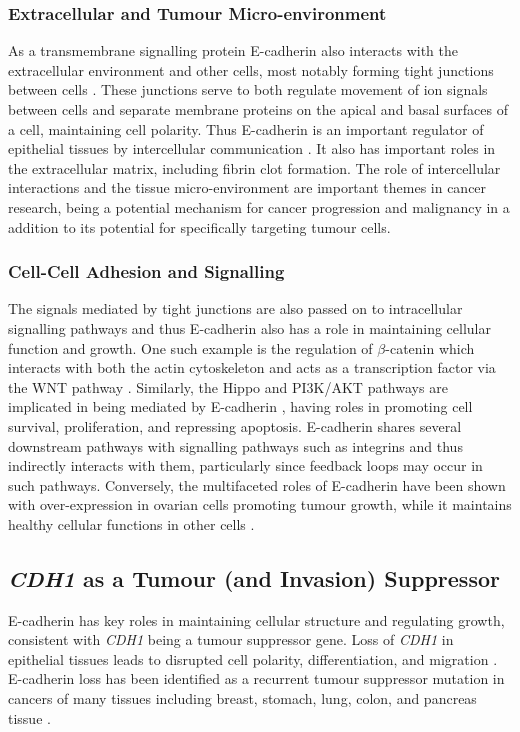 \subsubsection{Extracellular and Tumour Micro-environment}
As a transmembrane signalling protein \gls{E-cadherin} also interacts with the extracellular environment and other cells, most notably forming tight junctions between cells \citep{Chen2014, Tunggal2005}. These junctions serve to both regulate movement of ion signals between cells and separate membrane proteins on the apical and basal surfaces of a cell, maintaining cell polarity. Thus \gls{E-cadherin} is an important regulator of epithelial tissues by intercellular communication \citep{Jeanes2008}. It also has important roles in the extracellular matrix, including fibrin clot formation. The role of intercellular interactions and the tissue micro-environment are important themes in cancer research, being a potential mechanism for cancer progression and malignancy in a addition to its potential for specifically targeting tumour cells.

\subsubsection{Cell-Cell Adhesion and Signalling}
The signals mediated by tight junctions are also passed on to intracellular signalling pathways and thus \gls{E-cadherin} also has a role in maintaining cellular function and growth. One such example is the regulation of $\beta$-catenin which interacts with both the actin cytoskeleton and acts as a transcription factor via the \gls{WNT} pathway \citep{Jeanes2008}. Similarly, the Hippo and \gls{PI3K}/AKT pathways are implicated in being mediated by \gls{E-cadherin} \citep{DeSantis2009, Kim2011}, having roles in promoting cell survival, proliferation, and repressing apoptosis. \gls{E-cadherin} shares several downstream pathways with signalling pathways such as integrins and thus indirectly interacts with them, particularly since feedback loops may occur in such pathways. Conversely, the multifaceted roles of \gls{E-cadherin} have been shown with over-expression in ovarian cells promoting tumour growth, while it maintains healthy cellular functions in other cells \citep{Dong2012, Brouxhon2014}.


\subsection{\textit{CDH1} as a Tumour (and Invasion) Suppressor}
\gls{E-cadherin} has key roles in maintaining cellular structure and regulating growth, consistent with \textit{CDH1} being a \gls{tumour suppressor} gene. Loss of \textit{CDH1} in epithelial tissues leads to disrupted cell polarity, differentiation, and  migration \citep{Chen2014}. \gls{E-cadherin} loss has been identified as a recurrent  \gls{tumour suppressor} \gls{mutation} in  cancers of many tissues including breast, stomach, lung, colon, and pancreas tissue \citep{TCGA2017web}.

